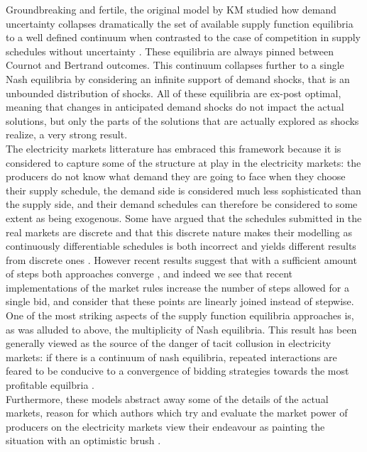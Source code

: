 Groundbreaking and fertile, the original model by KM studied how demand uncertainty collapses dramatically the set of available supply function equilibria to a well defined continuum when contrasted to the case of competition in supply schedules without uncertainty \cite{grossman1981nash}. These equilibria are always pinned between Cournot and Bertrand outcomes. This continuum collapses further to a single Nash equilibria by considering an infinite support of demand shocks, that is an unbounded distribution of shocks. All of these equilibria are ex-post optimal, meaning that changes in anticipated demand shocks do not impact the actual solutions, but only the parts of the solutions that are actually explored as shocks realize, a very strong result. \\

The electricity markets litterature has embraced this framework because it is considered to capture some of the structure at play in the electricity markets: the producers do not know what demand they are going to face when they choose their supply schedule, the demand side is considered much less sophisticated than the supply side, and their demand schedules can therefore be considered to some extent as being exogenous. Some have argued that the schedules submitted in the real markets are discrete and that this discrete nature makes their modelling as continuously differentiable schedules is both incorrect and yields different results from discrete ones \cite{von1993spot}. However recent results suggest that with a sufficient amount of steps both approaches converge \cite{holmberg2008supply}, and indeed we see that recent implementations of the market rules increase the number of steps allowed for a single bid, and consider that these points are linearly joined instead of stepwise.\\

One of the most striking aspects of the supply function equilibria approaches is, as was alluded to above, the multiplicity of Nash equilibria. This result has been generally viewed as the source of the danger of tacit collusion in electricity markets: if there is a continuum of nash equilibria, repeated interactions are feared to be conducive to a convergence of bidding strategies towards the most profitable equilbria \cite{bolle1992supply}. \\

Furthermore, these models abstract away some of the details of the actual markets, reason for which authors which try and evaluate the market power of producers on the electricity markets view their endeavour as painting the situation with an optimistic brush \cite{Newgreen}. \\

